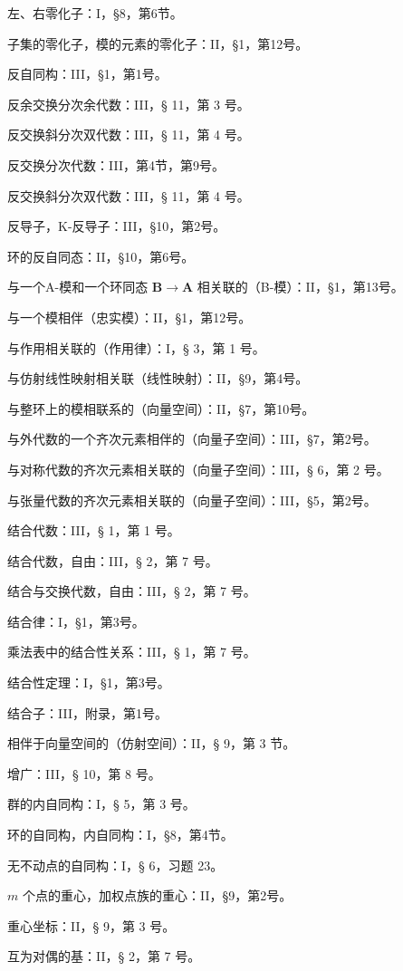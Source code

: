 左、右零化子：I，§8，第6节。

子集的零化子，模的元素的零化子：II，§1，第12号。

反自同构：III，§1，第1号。

反余交换分次余代数：III，§ 11，第 3 号。

反交换斜分次双代数：III，§ 11，第 4 号。

反交换分次代数：III，第4节，第9号。

反交换斜分次双代数：III，§ 11，第 4 号。

反导子，K-反导子：III，§10，第2号。

环的反自同态：II，§10，第6号。

与一个A-模和一个环同态 \(\mathbf{B} \to \mathbf{A}\) 相关联的（B-模）：II，§1，第13号。

与一个模相伴（忠实模）：II，§1，第12号。

与作用相关联的（作用律）：I，§ 3，第 1 号。

与仿射线性映射相关联（线性映射）：II，§9，第4号。

与整环上的模相联系的（向量空间）：II，§7，第10号。

与外代数的一个齐次元素相伴的（向量子空间）：III，§7，第2号。

与对称代数的齐次元素相关联的（向量子空间）：III，§ 6，第 2 号。

与张量代数的齐次元素相关联的（向量子空间）：III，§5，第2号。

结合代数：III，§ 1，第 1 号。

结合代数，自由：III，§ 2，第 7 号。

结合与交换代数，自由：III，§ 2，第 7 号。

结合律：I，§1，第3号。

乘法表中的结合性关系：III，§ 1，第 7 号。

结合性定理：I，§1，第3号。

结合子：III，附录，第1号。

相伴于向量空间的（仿射空间）：II，§ 9，第 3 节。

增广：III，§ 10，第 8 号。

群的内自同构：I，§ 5，第 3 号。

环的自同构，内自同构：I，§8，第4节。

无不动点的自同构：I，§ 6，习题 23。

\(m\) 个点的重心，加权点族的重心：II，§9，第2号。

重心坐标：II，§ 9，第 3 号。

互为对偶的基：II，§ 2，第 7 号。

